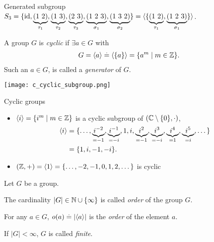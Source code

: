 \begin{ex}{Generated subgroup}{}
$S_3 = \{\id, \underbrace{(1\ 2)}_{\tau_1}, \underbrace{(1\ 3)}_{\tau_2}, \underbrace{(2\ 3)}_{\tau_3}, \underbrace{(1\ 2\ 3)}_{\sigma_1}, \underbrace{(1\ 3\ 2)}_{\sigma_2}\} = \gen{\{\underbrace{(1\ 2)}_{\tau_1}, \underbrace{(1\ 2\ 3)}_{\sigma_1}\}}$.
\end{ex}

\begin{defn}
A group $G$ is \emph{cyclic} if $\exists a \in G$ with \begin{align}
    G = \langle a \rangle \overset{.}{=} \langle \{a\} \rangle = \{a^m \mid m \in \mathbb{Z}\}.
\end{align} Such an $a \in G$, is called a \emph{generator} of $G$.
\end{defn}

\begin{marginfigure}
    \texttt{[image: c\_cyclic\_subgroup.png]}
    \caption{An illustration of the cyclic subgroup $\gen{i}$ in the complex plane.}
\end{marginfigure}

\begin{ex}{Cyclic groups}{}
\begin{itemize}
    \item $\langle i \rangle = \{i^m \mid m \in \mathbb{Z}\}$ is a cyclic subgroup of $(\mathbb{C} \setminus \{0\},\cdot)$, \begin{align*}
        \langle i \rangle &= \{\dots, \underbrace{i^{-2}}_{=-1}, \underbrace{i^{-1}}_{=-i}, 1, i, \underbrace{i^2}_{=-1}, \underbrace{i^3}_{=-i}, \underbrace{i^4}_{=1}, \underbrace{i^5}_{=i}, \dots\} \\
                &= \{1, i, -1, -i\}.
    \end{align*}
    \item $(\mathbb{Z},+) = \langle 1 \rangle = \{\dots, -2, -1, 0, 1, 2, \dots\}$ is cyclic
\end{itemize}
\end{ex}

\begin{defn}[Order]
Let $G$ be a group.
\begin{defnlist}
    \item The cardinality $|G| \in \mathbb{N} \cup \{\infty\}$ is called \emph{order} of the group $G$.
    \item For any $a \in G$, $o(a) \overset{.}{=} |\langle a \rangle|$ is the \emph{order} of the element $a$.
\end{defnlist} If $|G| < \infty$, $G$ is called \emph{finite}.
\end{defn}

